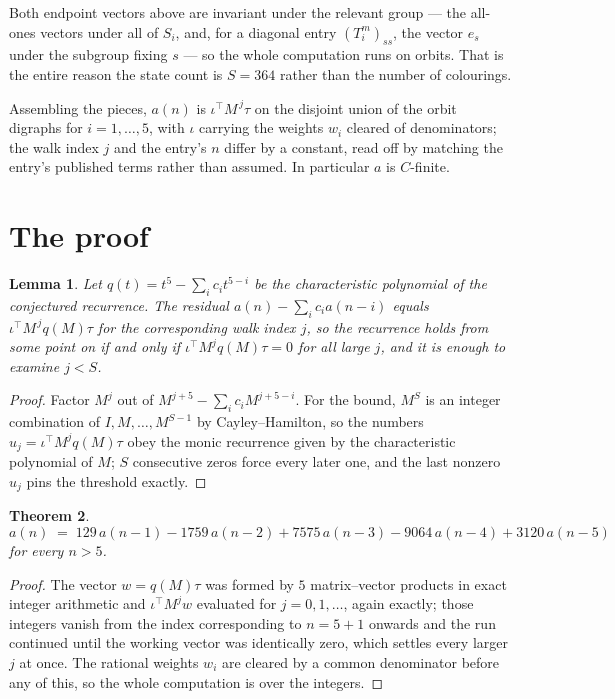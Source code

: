 \documentclass[11pt,a4paper]{article}
\theoremstyle{plain}
\newtheorem{theorem}{Theorem}
\newtheorem{lemma}[theorem]{Lemma}
\theoremstyle{definition}
\begin{document}
Both endpoint vectors above are invariant under the relevant group --- the all-ones vectors
under all of $S_i$, and, for a diagonal entry $(T_i^m)_{ss}$, the vector $e_s$ under the
subgroup fixing $s$ --- so the whole computation runs on orbits. That is the entire reason the
state count is $S=364$ rather than the number of colourings.

Assembling the pieces, $a(n)$ is $\iota^{\!\top}M^{\,j}\tau$ on the disjoint union of the
orbit digraphs for $i=1,\dots,5$, with $\iota$ carrying the weights $w_i$ cleared of
denominators; the walk index $j$ and the entry's $n$ differ by a constant, read off by
matching the entry's published terms rather than assumed. In particular $a$ is $C$-finite.

\section{The proof}

\begin{lemma}\label{lem:crit}
Let $q(t)=t^{5}-\sum_i c_it^{5-i}$ be the characteristic polynomial of the
conjectured recurrence. The residual $a(n)-\sum_ic_ia(n-i)$ equals
$\iota^{\!\top}M^{\,j}q(M)\tau$ for the corresponding walk index $j$, so the recurrence
holds from some point on if and only if $\iota^{\!\top}M^{j}q(M)\tau=0$ for all large $j$,
and it is enough to examine $j<S$.
\end{lemma}

\begin{proof}
Factor $M^{j}$ out of $M^{j+5}-\sum_ic_iM^{j+5-i}$. For the bound, $M^{S}$
is an integer combination of $I,M,\dots,M^{S-1}$ by Cayley--Hamilton, so the numbers
$u_j=\iota^{\!\top}M^{j}q(M)\tau$ obey the monic recurrence given by the characteristic
polynomial of $M$; $S$ consecutive zeros force every later one, and the last nonzero $u_j$
pins the threshold exactly.
\end{proof}

\begin{theorem}
\[
a(n)\;=\;129\,a(n-1) - 1759\,a(n-2) + 7575\,a(n-3) - 9064\,a(n-4) + 3120\,a(n-5)
\]
for every $n>5$.
\end{theorem}

\begin{proof}
The vector $w=q(M)\tau$ was formed by $5$ matrix--vector products in exact integer
arithmetic and $\iota^{\!\top}M^{j}w$ evaluated for $j=0,1,\dots$, again exactly; those
integers vanish from the index corresponding to $n=5+1$ onwards and the run continued
until the working vector was identically zero, which settles every larger $j$ at once. The
rational weights $w_i$ are cleared by a common denominator before any of this, so the whole
computation is over the integers.
\end{proof}
\end{document}
